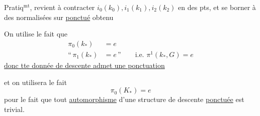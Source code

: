Pratiq$^{\mathrm{mt}}$,  revient à contracter $i_0(k_0),i_1(k_1),i_2(k_2)$ en des pts, et  se borner à des  normalisées sur   \uline{ponctué} obtenu

On utilise le fait que
\[
\begin{aligned}
\pi_0(k_*)&=e\\
\text{``}\,\pi_1(k_*)&=e\,\text{''}\qquad\text{i.e. }\pi^1(k_*,G)=e
\end{aligned}
\]
\uline{donc tte donnée de descente admet une ponctuation}

et on utilisera le fait
\[
\pi_0(K_*)=e
\]
pour le fait que  tout \uline{automorphisme} d'une structure de descente \uline{ponctuée} est trivial. 


